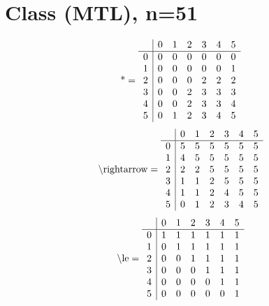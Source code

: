 \documentclass[11pt]{article}
\begin{document}
\section{Class (MTL), n=51}
\[\text{*} = 
\begin{array}{r | r r r r r r}
 & 0 & 1 & 2 & 3 & 4 & 5 \\ \hline
0 & 0 & 0 & 0 & 0 & 0 & 0 \\
1 & 0 & 0 & 0 & 0 & 0 & 1 \\
2 & 0 & 0 & 0 & 2 & 2 & 2 \\
3 & 0 & 0 & 2 & 3 & 3 & 3 \\
4 & 0 & 0 & 2 & 3 & 3 & 4 \\
5 & 0 & 1 & 2 & 3 & 4 & 5 \\
\end{array}
\]
\[\text{\textbackslash rightarrow} = 
\begin{array}{r | r r r r r r}
 & 0 & 1 & 2 & 3 & 4 & 5 \\ \hline
0 & 5 & 5 & 5 & 5 & 5 & 5 \\
1 & 4 & 5 & 5 & 5 & 5 & 5 \\
2 & 2 & 2 & 5 & 5 & 5 & 5 \\
3 & 1 & 1 & 2 & 5 & 5 & 5 \\
4 & 1 & 1 & 2 & 4 & 5 & 5 \\
5 & 0 & 1 & 2 & 3 & 4 & 5 \\
\end{array}
\]
\[\text{\textbackslash le} = 
\begin{array}{r | r r r r r r}
 & 0 & 1 & 2 & 3 & 4 & 5 \\ \hline
0 & 1 & 1 & 1 & 1 & 1 & 1 \\
1 & 0 & 1 & 1 & 1 & 1 & 1 \\
2 & 0 & 0 & 1 & 1 & 1 & 1 \\
3 & 0 & 0 & 0 & 1 & 1 & 1 \\
4 & 0 & 0 & 0 & 0 & 1 & 1 \\
5 & 0 & 0 & 0 & 0 & 0 & 1 \\
\end{array}
\]
\end{document}
